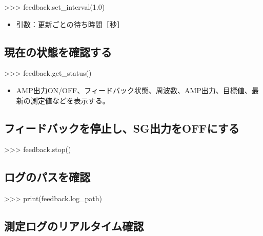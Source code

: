 \documentclass[a4paper,11pt]{ltjsarticle}
\begin{document}
\begin{command}

>>> feedback.set_interval(1.0)

\end{command}

\begin{itemize}

\item 引数：更新ごとの待ち時間［秒］

\end{itemize}

\subsection{現在の状態を確認する}

\begin{command}

>>> feedback.get_status()

\end{command}

\begin{itemize}

\item AMP出力ON/OFF、フィードバック状態、周波数、AMP出力、目標値、最新の測定値などを表示する。

\end{itemize}

\subsection{フィードバックを停止し、SG出力をOFFにする}

\begin{command}

>>> feedback.stop()

\end{command}

\subsection{ログのパスを確認}

\begin{command}

>>> print(feedback.log_path)

\end{command}

\subsection{測定ログのリアルタイム確認}
\end{document}

